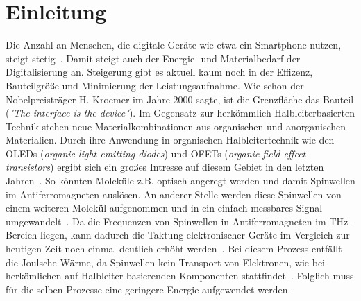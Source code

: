 \chapter{Einleitung}
    Die Anzahl an Menschen, die digitale Geräte wie etwa ein Smartphone nutzen, steigt stetig~\cite{Statista}.
    Damit steigt auch der Energie- und Materialbedarf der Digitalisierung an.
    Steigerung gibt es aktuell kaum noch in der Effizenz, Bauteilgröße und Minimierung der Leistungsaufnahme.
    Wie schon der Nobelpreisträger H. Kroemer im Jahre 2000 sagte, ist die Grenzfläche das Bauteil (\textit{"The interface is the device"}).
    Im Gegensatz zur herkömmlich Halbleiterbasierten Technik stehen neue Materialkombinationen aus organischen und anorganischen Materialien.
    Durch ihre Anwendung in organischen Halbleitertechnik wie den OLEDs (\textit{organic light emitting diodes}) und OFETs (\textit{organic field effect transistors}) ergibt sich ein großes Intresse auf diesem Gebiet in den letzten Jahren~\cite{Uni-Tübingen}.
    So könnten Moleküle z.B. optisch angeregt werden und damit Spinwellen im Antiferromagneten auslösen. 
    An anderer Stelle werden diese Spinwellen von einem weiteren Molekül aufgenommen und in ein einfach messbares Signal umgewandelt~\cite{SINFONIA}.
    Da die Frequenzen von Spinwellen in Antiferromagneten im \si{\tera\hertz}-Bereich liegen, kann dadurch die Taktung elektronischer Geräte im Vergleich zur heutigen Zeit noch einmal deutlich erhöht werden~\cite{AFM_5}.
    Bei diesem Prozess entfällt die Joulsche Wärme, da Spinwellen kein Transport von Elektronen, wie bei herkömlichen auf Halbleiter basierenden Komponenten stattfindet~\cite{AFM_3}.
    Folglich muss für die selben Prozesse eine geringere Energie aufgewendet werden.
   
